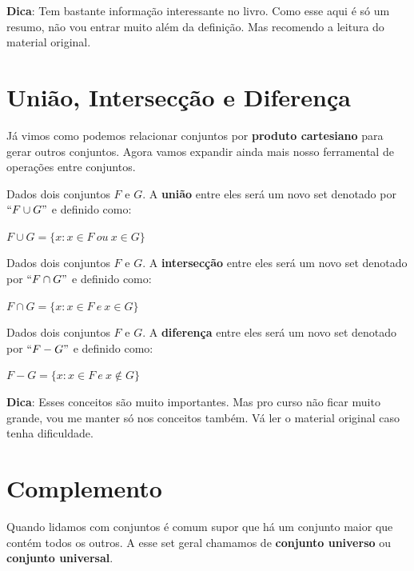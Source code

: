 \documentclass[main.tex]{subfiles}
\begin{document}
\textbf{Dica}: Tem bastante informação interessante no livro. Como esse aqui é só um resumo, não vou entrar muito além da definição. Mas recomendo a leitura do material original.

\section{União, Intersecção e Diferença}
Já vimos como podemos relacionar conjuntos por \textbf{produto cartesiano} para gerar outros conjuntos. Agora vamos expandir ainda mais nosso ferramental de operações entre conjuntos.

\begin{definition}[União]
Dados dois conjuntos $F$ e $G$. A \textbf{união} entre eles será um novo set denotado por $``F \cup G"$ e definido como:
\begin{center}
	$F \cup G = \{ x : x \in F \ ou \ x \in G \}$
\end{center}
\end{definition}

\begin{definition}[Intersecção]
Dados dois conjuntos $F$ e $G$. A \textbf{intersecção} entre eles será um novo set denotado por $``F \cap G"$ e definido como:
\begin{center}
	$F \cap G = \{ x : x \in F \ e \ x \in G \}$
\end{center}
\end{definition}

\begin{definition}[Diferença]
Dados dois conjuntos $F$ e $G$. A \textbf{diferença} entre eles será um novo set denotado por $``F - G"$ e definido como:
\begin{center}
	$F - G = \{ x : x \in F \ e \ x \notin G \}$
\end{center}
\end{definition}

\textbf{Dica}: Esses conceitos são muito importantes. Mas pro curso não ficar muito grande, vou me manter só nos conceitos também. Vá ler o material original caso tenha dificuldade.

\section{Complemento}
Quando lidamos com conjuntos é comum supor que há um conjunto maior que contém todos os outros. A esse set geral chamamos de \textbf{conjunto universo} ou \textbf{conjunto universal}.
\end{document}
